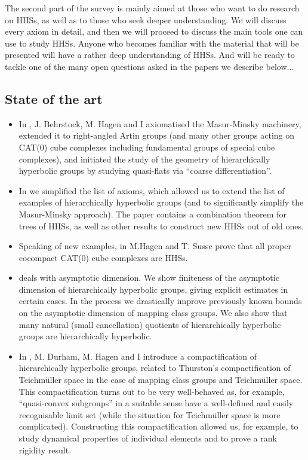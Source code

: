 \documentclass[11pt,oneside]{amsart}
\newcounter{ax}
\theoremstyle{definition}
\begin{document}
The second part of the survey is mainly aimed at those who want to do research on HHSs, as well as to those who seek deeper understanding. We will discuss every axiom in detail, and then we will proceed to discuss the main tools one can use to study HHSs. Anyone who becomes familiar with the material that will be presented will have a rather deep understanding of HHSs. And will be ready to tackle one of the many open questions asked in the papers we describe below...

\subsection*{State of the art}

\begin{itemize}
 \item In \cite{HHS1}, J. Behrstock, M. Hagen and I axiomatised the Masur-Minsky machinery, extended it to right-angled Artin groups (and many other groups acting on CAT(0) cube complexes including fundamental groups of special cube complexes), and initiated the study of the geometry of hierarchically hyperbolic groups by studying quasi-flats via ``coarse differentiation''.
 \item In \cite{HHS2} we simplified the list of axioms, which allowed us to extend the list of examples of hierarchically hyperbolic groups (and to significantly simplify the Masur-Minsky approach). The paper contains a combination theorem for trees of HHSs, as well as other results to construct new HHSs out of old ones. 
 \item Speaking of new examples, in \cite{HagenSusse} M.Hagen and T. Susse prove that all proper cocompact CAT(0) cube complexes are HHSs.
 \item \cite{HHS_asdim} deals with asymptotic dimension. We show finiteness of the asymptotic dimension of hierarchically hyperbolic groups, giving explicit estimates in certain cases. In the process we drastically improve previously known bounds on the asymptotic dimension of mapping class groups. We also show that many natural (small cancellation) quotients of hierarchically hyperbolic groups are hierarchically hyperbolic.
 \item In \cite{HHS_boundary}, M. Durham, M. Hagen and I introduce a compactification of hierarchically hyperbolic groups, related to Thurston's compactification of Teichm\"uller space in the case of mapping class groups and Teichm\"uller space. This compactification turns out to be very well-behaved as, for example, ``quasi-convex subgroups'' in a suitable sense have a well-defined and easily recognisable limit set (while the situation for Teichm\"uller space is more complicated). Constructing this compactification allowed us, for example, to study dynamical properties of individual elements and to prove a rank rigidity result.

\end{itemize}
\end{document}
